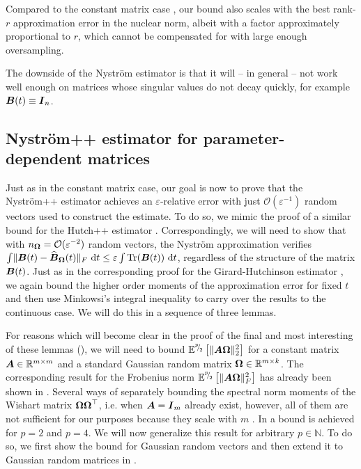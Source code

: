 \documentclass[12pt]{article}
\begin{document}
Compared to the constant matrix case \cite[theorem 8.1]{tropp-2023-randomized-algorithms}, our bound also scales with the best rank-$r$ approximation error in the nuclear norm, albeit with a factor approximately proportional to $r$, which cannot be compensated for with large enough oversampling.

The downside of the Nyström estimator is that it will -- in general -- not work well enough on matrices whose singular values do not decay quickly, for example $\boldsymbol{B}(t) \equiv \boldsymbol{I}_n$.

\subsection{Nyström++ estimator for parameter-dependent matrices}
\label{subsec:nystrom-pp}

Just as in the constant matrix case, our goal is now to prove that the Nyström++ estimator  achieves an $\varepsilon$-relative error with just $\mathcal{O}(\varepsilon^{-1})$ random vectors used to construct the estimate. To do so, we mimic the proof of a similar bound for the Hutch++ estimator \cite[theorem 3.1]{meyer-2021-hutch-optimal}. Correspondingly, we will need to show that with $n_{\boldsymbol{\Omega}} = \mathcal{O}(\varepsilon^{-2})$ random vectors, the Nyström approximation verifies $\int \lVert \boldsymbol{B}(t) - \widehat{\boldsymbol{B}}_{\boldsymbol{\Omega}}(t)\rVert _F~\mathrm{d}t \leq \varepsilon \int \operatorname{Tr}(\boldsymbol{B}(t))~\mathrm{d}t$, regardless of the structure of the matrix $\boldsymbol{B}(t)$. Just as in the corresponding proof for the Girard-Hutchinson estimator , we again bound the higher order moments of the approximation error for fixed $t$ and then use Minkowsi's integral inequality to carry over the results to the continuous case. We will do this in a sequence of three lemmas.

For reasons which will become clear in the proof of the final and most interesting of these lemmas (), we will need to bound $\mathbb{E}^{{}^{p}{\mskip -5mu/\mskip -3mu}_{2}}\left[\lVert \boldsymbol{A} \boldsymbol{\Omega} \rVert _2^2 \right]$ for a constant matrix $\boldsymbol{A} \in \mathbb{R}^{m \times m}$ and a standard Gaussian random matrix $\boldsymbol{\Omega} \in \mathbb{R}^{m \times k}$. The corresponding result for the Frobenius norm $\mathbb{E}^{{}^{p}{\mskip -5mu/\mskip -3mu}_{2}}\left[\lVert \boldsymbol{A} \boldsymbol{\Omega} \rVert _F^2 \right]$ has already been shown in \cite[lemma 7]{kressner-2023-randomized-lowrank}. Several ways of separately bounding the spectral norm moments of the Wishart matrix $\boldsymbol{\Omega} \boldsymbol{\Omega}^{\top}$, i.e. when $\boldsymbol{A} = \boldsymbol{I}_m$ already exist, however, all of them are not sufficient for our purposes because they scale with $m$ \cite{chen-2005-condition-numbers, edelman-1988-eigenvalues-condition, james-1964-distributions-matrix}. In \cite[lemma B.1]{tropp-2023-randomized-algorithms} a bound is achieved for $p = 2$ and $p = 4$. We will now generalize this result for arbitrary $p \in \mathbb{N}$. To do so, we first show the bound for Gaussian random vectors and then extend it to Gaussian random matrices in .
\end{document}
